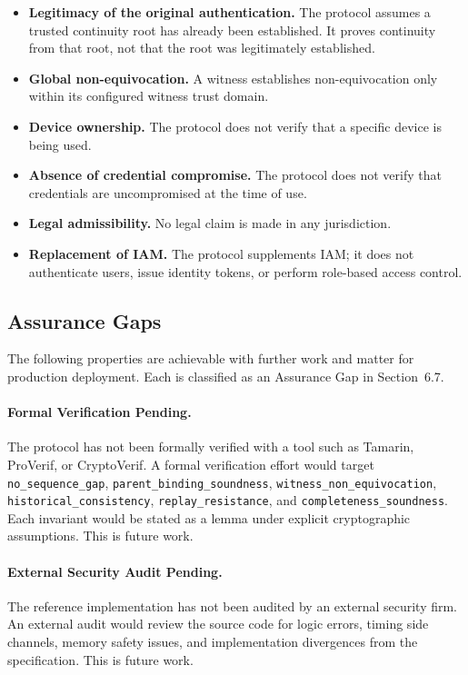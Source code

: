 \documentclass[11pt,a4paper]{article}
\begin{document}
\begin{itemize}
\item \textbf{Legitimacy of the original authentication.} The protocol assumes a trusted continuity root has already been established. It proves continuity from that root, not that the root was legitimately established.
\item \textbf{Global non-equivocation.} A witness establishes non-equivocation only within its configured witness trust domain.
\item \textbf{Device ownership.} The protocol does not verify that a specific device is being used.
\item \textbf{Absence of credential compromise.} The protocol does not verify that credentials are uncompromised at the time of use.
\item \textbf{Legal admissibility.} No legal claim is made in any jurisdiction.
\item \textbf{Replacement of IAM.} The protocol supplements IAM; it does not authenticate users, issue identity tokens, or perform role-based access control.
\end{itemize}

\subsection{Assurance Gaps}

The following properties are achievable with further work and matter for production deployment. Each is classified as an Assurance Gap in Section~6.7.

\paragraph{Formal Verification Pending.} The protocol has not been formally verified with a tool such as Tamarin, ProVerif, or CryptoVerif. A formal verification effort would target \texttt{no\_sequence\_gap}, \texttt{parent\_binding\_soundness}, \texttt{witness\_non\_equivocation}, \texttt{historical\_consistency}, \texttt{replay\_resistance}, and \texttt{completeness\_soundness}. Each invariant would be stated as a lemma under explicit cryptographic assumptions. This is future work.

\paragraph{External Security Audit Pending.} The reference implementation has not been audited by an external security firm. An external audit would review the source code for logic errors, timing side channels, memory safety issues, and implementation divergences from the specification. This is future work.
\end{document}
